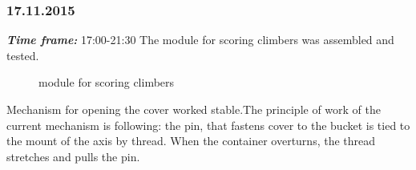 \subsubsection{17.11.2015}
\textit{\textbf{Time frame:}} 17:00-21:30 \newline
The module for scoring climbers was assembled and tested.

\begin{figure}[H]
	\begin{minipage}[h]{1\linewidth}
		\caption{module for scoring climbers}
	\end{minipage}
\end{figure}

Mechanism for opening the cover worked stable.The principle of work of the current mechanism is following: the pin, that fastens cover to the bucket is tied to the mount of the axis by thread. When the container overturns, the thread stretches and pulls the pin.

